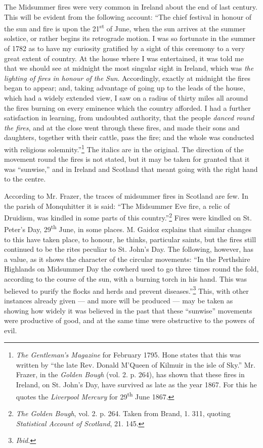 \documentclass[a4paper, 11pt, oneside, polutonikogreek, english]{article}
\begin{document}
The Midsummer fires were very common in Ireland about the end of last century. This will be evident from the following account: ``The chief festival in honour of the sun and fire is upon the 21\textsuperscript{st} of June, when the sun arrives at the summer solstice, or rather begins its retrograde motion. I was so fortunate in the summer of 1782 as to have my curiosity gratified by a sight of this ceremony to a very great extent of country. At the house where I was entertained, it was told me that we should see at midnight the most singular sight in Ireland, which was \emph{the lighting of fires in honour of the Sun}. Accordingly, exactly at midnight the fires began to appear; and, taking advantage of going up to the leads of the house, which had a widely extended view, I saw on a radius of thirty miles all around the fires burning on every eminence which the country afforded. I had a further satisfaction in learning, from undoubted authority, that the people \emph{danced round the fires}, and at the close went through these fires, and made their sons and daughters, together with their cattle, pass the fire; and the whole was conducted with religious solemnity.''\footnote{\emph{The Gentleman's Magazine} for February 1795. Hone states that this was written by ``the late Rev. Donald M'Queen of Kilmuir in the isle of Sky.'' Mr. Frazer, in the \emph{Golden Bough} (vol. 2. p. 264), has shown that these fires in Ireland, on St. John's Day, have survived as late as the year 1867. For this he quotes the \emph{Liverpool Mercury} for 29\textsuperscript{th} June 1867.} The italics are in the original. The direction of the movement round the fires is not stated, but it may be taken for granted that it was ``sunwise,'' and in Ireland and Scotland that meant going with the right hand to the centre.

According to Mr. Frazer, the traces of midsummer fires in Scotland are few. In the parish of Monquhitter it is said: ``The Midsummer Eve fire, a relic of Druidism, was kindled in some parts of this country.''\footnote{\emph{The Golden Bough}, vol. 2. p. 264. Taken from Brand, 1. 311, quoting \emph{Statistical Account of Scotland}, 21. 145.} Fires were kindled on St. Peter's Day, 29\textsuperscript{th} June, in some places. M. Gaidoz explains that similar changes to this have taken place, to honour, he thinks, particular saints, but the fires still continued to be the rites peculiar to St. John's Day. The following, however, has a value, as it shows the character of the circular movements: ``In the Perthshire Highlands on Midsummer Day the cowherd used to go three times round the fold, according to the course of the sun, with a burning torch in his hand. This was believed to purify the flocks and herds and prevent diseases.''\footnote{\emph{Ibid.}} This, with other instances already given --- and more will be produced --- may be taken as showing how widely it was believed in the past that these ``sunwise'' movements were productive of good, and at the same time were obstructive to the powers of evil.
\end{document}
